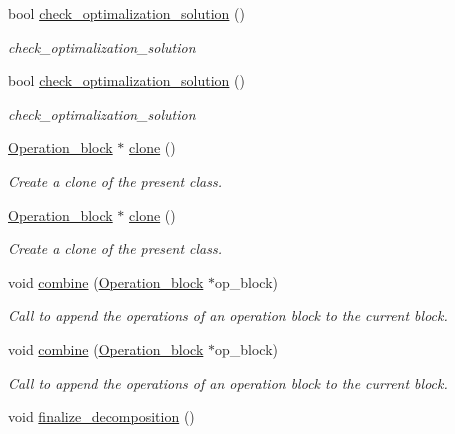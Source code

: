 \begin{DoxyCompactItemize}
bool \hyperlink{class_decomposition___base_aa01a8d70b76215a235cb0d71894b2595}{check\+\_\+optimalization\+\_\+solution} ()
\begin{DoxyCompactList}\small\item\em check\+\_\+optimalization\+\_\+solution \end{DoxyCompactList}\item 
bool \hyperlink{class_decomposition___base_aa01a8d70b76215a235cb0d71894b2595}{check\+\_\+optimalization\+\_\+solution} ()
\begin{DoxyCompactList}\small\item\em check\+\_\+optimalization\+\_\+solution \end{DoxyCompactList}\item 
\hyperlink{class_operation__block}{Operation\+\_\+block} $\ast$ \hyperlink{class_operation__block_a2aa75d20b21c3b5802730c0abe54db5e}{clone} ()
\begin{DoxyCompactList}\small\item\em Create a clone of the present class. \end{DoxyCompactList}\item 
\hyperlink{class_operation__block}{Operation\+\_\+block} $\ast$ \hyperlink{class_operation__block_af5d1f81be3a54eada1de293d1e9877c5}{clone} ()
\begin{DoxyCompactList}\small\item\em Create a clone of the present class. \end{DoxyCompactList}\item 
void \hyperlink{class_operation__block_a60062cf6f48ebfdcaae9db3367a66147}{combine} (\hyperlink{class_operation__block}{Operation\+\_\+block} $\ast$op\+\_\+block)
\begin{DoxyCompactList}\small\item\em Call to append the operations of an operation block to the current block. \end{DoxyCompactList}\item 
void \hyperlink{class_operation__block_a60062cf6f48ebfdcaae9db3367a66147}{combine} (\hyperlink{class_operation__block}{Operation\+\_\+block} $\ast$op\+\_\+block)
\begin{DoxyCompactList}\small\item\em Call to append the operations of an operation block to the current block. \end{DoxyCompactList}\item 
void \hyperlink{class_decomposition___base_a0cdd12741e72e2c074a188fe3867e6d5}{finalize\+\_\+decomposition} ()

\end{DoxyCompactItemize}
